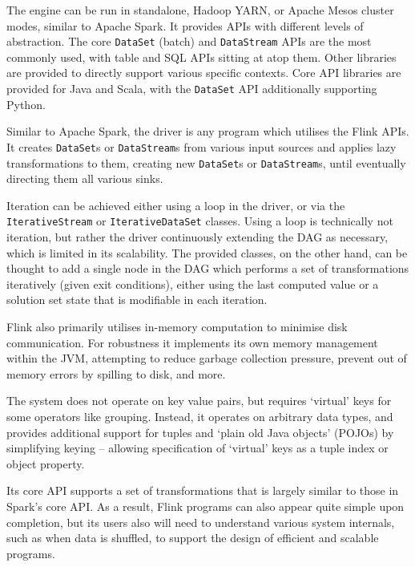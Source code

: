   The engine can be run in standalone, Hadoop YARN, or Apache Mesos cluster modes, similar to Apache Spark. It provides APIs with different levels of abstraction. The core \texttt{DataSet} (batch) and \texttt{DataStream} APIs are the most commonly used, with table and SQL APIs sitting at atop them. Other libraries are provided to directly support various specific contexts. Core API libraries are provided for Java and Scala, with the \texttt{DataSet} API additionally supporting Python.
  
  Similar to Apache Spark, the driver is any program which utilises the Flink APIs. It creates \texttt{DataSet}s or \texttt{DataStream}s from various input sources and applies lazy transformations to them, creating new \texttt{DataSet}s or \texttt{DataStream}s, until eventually directing them all various sinks.
  
  Iteration can be achieved either using a loop in the driver, or via the \texttt{IterativeStream} or \texttt{IterativeDataSet} classes. Using a loop is technically not iteration, but rather the driver continuously extending the DAG as necessary, which is limited in its scalability. The provided classes, on the other hand, can be thought to add a single node in the DAG which performs a set of transformations iteratively (given exit conditions), either using the last computed value or a solution set state that is modifiable in each iteration.
  
  Flink also primarily utilises in-memory computation to minimise disk communication. For robustness it implements its own memory management within the JVM, attempting to reduce garbage collection pressure, prevent out of memory errors by spilling to disk, and more. 
  
  The system does not operate on key value pairs, but requires `virtual' keys for some operators like grouping. Instead, it operates on arbitrary data types, and provides additional support for tuples and `plain old Java objects' (POJOs) by simplifying keying -- allowing specification of `virtual' keys as a tuple index or object property.
  
  Its core API supports a set of transformations that is largely similar to those in Spark's core API. As a result, Flink programs can also appear quite simple upon completion, but its users also will need to understand various system internals, such as when data is shuffled, to support the design of efficient and scalable programs.